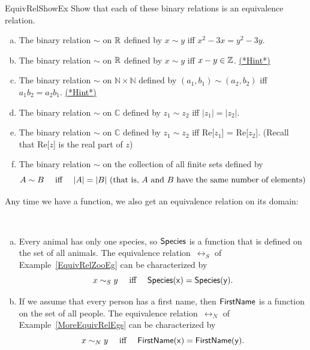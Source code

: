 \begin{exercise}{EquivRelShowEx}
Show that each of these binary relations is an equivalence relation.
\begin{enumerate}[(a)]
\item \label{EquivRelShowEx-x2min3x}
The binary relation $\sim$ on $\mathbb{R}$ defined by $x \sim y$ iff $x^2 - 3x = y^2 - 3y$.
\item \label{EquivRelShowEx-xminyinZ}
The binary relation $\sim$ on $\mathbb{R}$ defined by $x \sim y$ iff $x - y \in \mathbb{Z}$.
\hyperref[sec:EquivalenceRelationsChap:hints]{(*Hint*)}
\item \label{EquivRelShowEx-ab=ab}
The binary relation $\sim$ on $\mathbb{N} \times \mathbb{N}$ defined by $(a_1,b_1) \sim (a_2,b_2)$ iff $a_1 b_2 = a_2 b_1$.
\hyperref[sec:EquivalenceRelationsChap:hints]{(*Hint*)}
\item \label{EquivRelComplex1}
The binary relation $\sim$ on $\mathbb{C}$ defined by $z_1 \sim z_2$ iff $|z_1|=|z_2|$.
\item \label{EquivRelComplex1}
The binary relation $\sim$ on $\mathbb{C}$  defined by $z_1 \sim z_2$ iff Re[$z_1$] = Re[$z_2$].  (Recall that Re[$z$] is the real part of $z$)
\item
The binary relation $\sim$ on the collection of all finite sets defined by
	$$ \text{$A \sim B$ \quad iff \quad $|A|=|B|$ (that is, $A$ and $B$ have the same number of elements)} $$
\end{enumerate}
\end{exercise}


Any time we have a function, we also get an equivalence relation on its domain:

\begin{eg} \ 
\begin{enumerate}[(a)]
\item Every animal has only one species, so $\sf{Species}$ is a function that is defined on the set of all animals. The equivalence relation~$\rel_S$ of Example~\ref{EquivRelZooEg} can be characterized by
	$$ \text{$x \sim_S y$ \quad iff \quad $\sf{Species}(x) = \sf{Species}(y)$} .$$
\item If we assume that every person has a first name, then $\sf{FirstName}$ is a function on the set of all people. The equivalence relation~$\rel_N$ of Example~\ref{MoreEquivRelEgs} can be characterized by
	$$ \text{$x \sim_N y$ \quad iff \quad $\sf{FirstName}(x) = \sf{FirstName}(y)$} .$$
\end{enumerate}
\end{eg}


